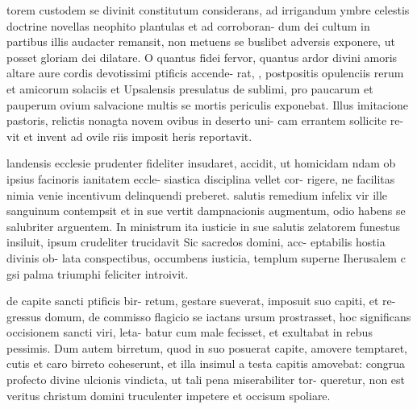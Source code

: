 \documentclass[a4paper, 12pt]{article}
\begin{document}
\begin{mstextura}
  tor{em}  custodem se divinit
  constitutum considerans, ad 
irrigandum ymbre celestis 
doctrine novellas neophito 
plantulas et ad corroboran-
dum dei cultum in partibus
illis audacter remansit, non 
metuens se buslibet adversis 
exponere, ut posset gloriam 
dei dilatare. O quantus fidei 
fervor, quantus ardor divini 
amoris altare aure cordis 
devotissimi ptificis accende- 
rat, , postpositis opulenciis 
rerum {et} amico{rum} solaciis 
et Upsalensis presulatus de 
sublimi, {pro} paucarum et\,
pauperum ovium salvacione 
multis se mortis periculis 
exponebat. Illus imitacione 
pastoris,  relictis nonagta 
novem ovi{bus} in deserto uni-
cam errantem sollicite re-
vit et invent ad ovile riis imposit heris reportavit.


landensis ecclesie prudenter  
fideliter insudaret, accidit, ut 
homicidam ndam ob ipsius 
facinoris ianitatem eccle- 
siastica disciplina vellet cor- rigere, ne facilitas nimia 
venie incentivum delinquendi 
preberet.  salutis remedium 
infelix vir ille sanguinum 
contempsit et in sue vertit 
dampnacionis augmentum, 
odio habens se salubriter 
arguentem. In ministrum 
ita iusticie  in sue salutis 
zelatorem funestus insiluit, 
ipsum crudeliter trucidavit
Sic sacredos domini, acc- 
eptabilis hostia divinis ob-
lata {con}specti{bus}, occumbens 
 iusticia, templum superne 
Iherusalem c gsi palma 
triumphi feliciter introivit. 

de capite sancti ptificis bir- 
retum,  gestare sueverat, 
imposuit suo capiti, {et} re- 
gressus domum, de commisso 
flagicio se iactans  ursum 
prostrasset,  hoc significans 
occisionem sancti viri, leta- 
batur cum male fecisset, et 
exultabat in rebus pessimis. 
Dum autem birretum, quod 
in suo posuerat capite, 
amovere temptaret, cutis et 
caro birreto coheserunt, et 
illa insimul a testa capitis 
amovebat: congrua profecto 
divine ulcionis vindicta, ut 
tali pena miserabiliter tor- 
queretur,  non est veritus 
christum domini truculenter 
impetere et occisum spoliare. 
\end{mstextura}
\end{document}
